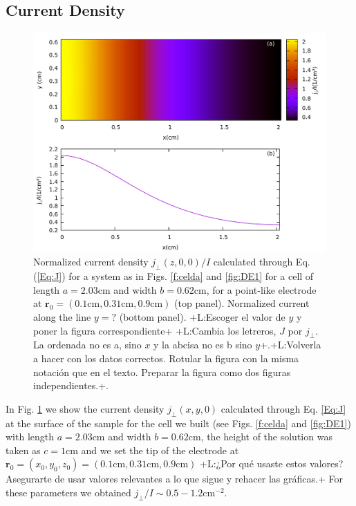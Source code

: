 \documentclass{article}
\newcommand{\notaL}[1]{{\color{blue}+L:#1+}}
\begin{document}
\subsection{Current Density}
\label{sec:current-density}
\begin{figure}
  \centering
  \includegraphics[width=\textwidth]{Images/G123}
  \caption{Normalized current density $j_\perp(z,0,0)/I$ calculated through
    Eq. (\ref{Eq:J}) for a
    system as in Figs. \ref{f:celda} and \ref{fig:DE1} for a cell of
    length $a = 2.03\text{cm}$ and width $b=0.62\text{cm}$, for a
    point-like electrode at $\bm r_0=(0.1\text{cm},
    0.31\text{cm},0.9\text{cm})$ (top panel). Normalized current
    along the line $y=?$ (bottom panel). \notaL{Escoger el valor de
      $y$ y poner la figura correspondiente} \notaL{Cambia los letreros, $J$ por
      $j_\perp$. La ordenada no es a, sino $x$ y la abcisa no es b
      sino $y$}.\notaL{Volverla a hacer con los datos
      correctos. Rotular la figura con la misma notación que en el
      texto. Preparar la figura como dos figuras independientes.}. }
  \label{fig:DR1}
\end{figure}
In Fig. \ref{fig:DR1} we show the current density $j_\perp(x,y,0)$ calculated through
Eq. \eqref{Eq:J} at the surface of the sample for the cell we built
(see Figs. \ref{f:celda} and \ref{fig:DE1}) with length
$a=2.03\text{cm}$ and width $b = 0.62\text{cm}$, the height of the
solution was taken as $c=1\text{cm}$ and we set the tip of the
electrode at $\bm
r_0=(x_0,y_0,z_0)=(0.1\text{cm},0.31\text{cm},0.9\text{cm})$
\notaL{¿Por qué usaste estos valores? Asegurarte de usar valores
  relevantes a lo que sigue y rehacer las gráficas.}
For these parameters we obtained $ j_\perp/I\sim
0.5-1.2\text{cm}^{-2}$.
\end{document}
